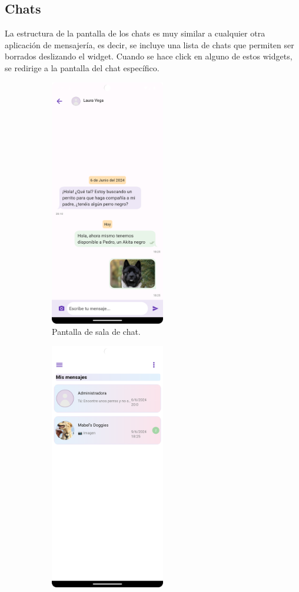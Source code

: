 \documentclass[a4paper, 12pt]{article}
\begin{document}
\newpage
\subsection*{Chats}

La estructura de la pantalla de los chats es muy similar a cualquier otra aplicación de mensajería, es decir, se incluye una lista de chats que permiten ser borrados deslizando el widget. Cuando se hace click en alguno de estos widgets, se redirige a la pantalla del chat específico.

\begin{figure}[H]
   	\begin{subfigure}{0.48\textwidth}
		\begin{center}
			{\includegraphics[width=5cm]{app/ChatRoom.png}\par}
			\caption{Pantalla de sala de chat.}
		\end{center}  
	\end{subfigure}\hfill
   	\begin{subfigure}{0.48\textwidth}
		\begin{center}
			{\includegraphics[width=5cm]{app/ChatsPageReceiver.png}\par}

\end{center}
\end{subfigure}
\end{figure}
\end{document}

